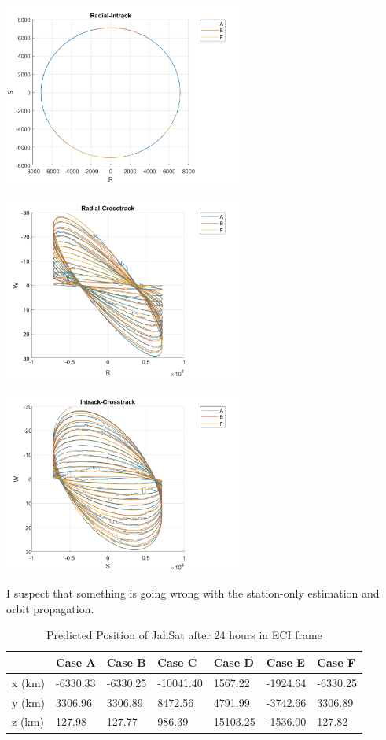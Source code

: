 \documentclass[conf]{new-aiaa}
\begin{document}
\begin{center}
	\includegraphics[width=0.6\textwidth]{radial-intrackABF.png}
	
	\includegraphics[width=0.6\textwidth]{radial-crosstrackABF.png}
	
	\includegraphics[width=0.6\textwidth]{intrack-crosstrackABF.png}
\end{center}

I suspect that something is going wrong with the station-only estimation and orbit propagation. 

\begin{table}[H]
	\begin{center}
	\begin{tabular}{|l|l|l|l|l|l|l|}
		\hline
		& Case A            & Case B           & Case C            & Case D           & Case E            & Case F            \\ \hline
		x (km) & -6330.33 & -6330.25  & -10041.40  & 1567.22  & -1924.64  & -6330.25 \\ \hline
		y (km) & 3306.96  & 3306.89   & 8472.56    & 4791.99  & -3742.66  & 3306.89  \\ \hline
		z (km) & 127.98   & 127.77    & 986.39     & 15103.25 & -1536.00  & 127.82   \\ \hline
	\end{tabular}
\caption{Predicted Position of JahSat after 24 hours in ECI frame}
\end{center}
\end{table}
\end{document}
